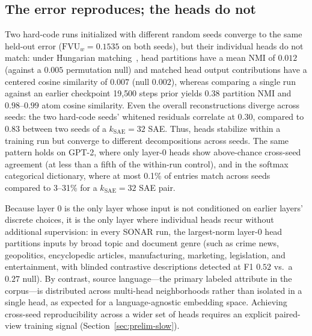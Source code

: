 \subsection{The error reproduces; the heads do not}
\label{sec:prelim-seed}
Two hard-code runs initialized with different random seeds converge to
the same held-out error ($\mathrm{FVU}_w = 0.1535$ on both seeds), but
their individual heads do not match: under Hungarian
matching~\cite{kuhn1955}, head partitions have a mean NMI of $0.012$
(against a $0.005$ permutation null) and
matched head output contributions have a centered cosine similarity of
$0.007$ (null $0.002$), whereas comparing a single run against an earlier
checkpoint 19{,}500 steps prior yields $0.38$ partition NMI and
$0.98$--$0.99$ atom cosine similarity. Even the overall reconstructions
diverge across seeds: the two hard-code seeds' whitened residuals
correlate at $0.30$, compared to $0.83$ between two seeds of a
$k_{\mathrm{SAE}}{=}32$ SAE. Thus, heads stabilize within a training run
but converge to different decompositions across seeds. The same pattern
holds on GPT-2, where only layer-0 heads show above-chance cross-seed
agreement (at less than a fifth of the within-run control), and in the
softmax categorical dictionary, where at most 0.1\% of entries match
across seeds
compared to 3--31\% for a $k_{\mathrm{SAE}}{=}32$ SAE pair.

Because layer 0 is the only layer whose input is not conditioned on
earlier layers' discrete choices, it is the only layer where individual
heads recur without additional supervision: in every SONAR run, the
largest-norm layer-0 head partitions inputs by broad topic and document
genre (such as crime news, geopolitics, encyclopedic articles,
manufacturing, marketing, legislation, and entertainment, with blinded
contrastive descriptions detected at F1 $0.52$ vs.\ a $0.27$ null).
By contrast, source language---the primary labeled attribute in the
corpus---is distributed across multi-head neighborhoods rather than
isolated in a single head, as expected for a language-agnostic embedding
space. Achieving cross-seed reproducibility across a wider set of heads
requires an explicit paired-view training signal
(Section~\ref{sec:prelim-slow}).

